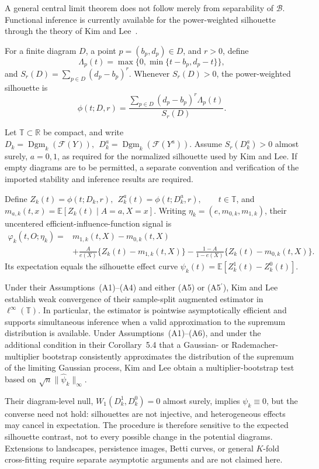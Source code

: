 \documentclass[11pt,a4paper]{article}
\theoremstyle{plain}
\theoremstyle{definition}
\theoremstyle{remark}
\newcommand{\1}{\mathbbm{1}}
\begin{document}
A general central limit theorem does not follow merely from
separability of \(\mathcal B\). Functional inference is currently available for the power-weighted silhouette through the theory of Kim and Lee~\citep{kimlee2026}.

For a finite diagram \(D\), a point \(p=(b_p,d_p)\in D\), and \(r>0\), define
\[
\Lambda_p(t)
=
\max\{0,\min\{t-b_p,d_p-t\}\},
\]
and \(S_r(D) = \sum_{p\in D}(d_p-b_p)^r\). Whenever \(S_r(D)>0\), the power-weighted silhouette is
\[
\phi(t;D,r)
=
\frac{
\sum_{p\in D}(d_p-b_p)^r\Lambda_p(t)
}{
S_r(D)
}.
\]

Let \(\mathbb T\subset\mathbb R\) be compact, and write
\(D_k = \operatorname{Dgm}_k(\mathcal F(Y)),
\ \ D_k^a = \operatorname{Dgm}_k(\mathcal F(Y^a))\). Assume
\(S_r(D_k^a)>0\) almost surely, \(a=0,1\), as required for the normalized silhouette used by Kim and Lee. If empty diagrams are to be permitted, a separate convention and verification of the imported stability and inference results are required.

Define \(Z_k(t)=\phi(t;D_k,r),\ \ Z_k^a(t)=\phi(t;D_k^a,r),
\qquad t\in\mathbb T\), and \(m_{a,k}(t,x) = \mathbb E[Z_k(t)\mid A=a,X=x]\). Writing \(\eta_k=(e,m_{0,k},m_{1,k})\), their uncentered efficient-influence-function signal is
\[
\begin{aligned}
\varphi_k(t,O;\eta_k)
={}&
m_{1,k}(t,X)-m_{0,k}(t,X) \\
&+
\frac{A}{e(X)}
\{Z_k(t)-m_{1,k}(t,X)\}
-
\frac{1-A}{1-e(X)}
\{Z_k(t)-m_{0,k}(t,X)\}.
\end{aligned}
\]
Its expectation equals the silhouette effect curve
\(\psi_k(t) = \mathbb E[Z_k^1(t)-Z_k^0(t)]\).

Under their Assumptions~(A1)--(A4) and either (A5) or (A5\(^{\prime}\)), Kim and Lee~\citep[Theorem~5.2]{kimlee2026} establish weak convergence of their sample-split augmented estimator in \(\ell^\infty(\mathbb T)\). In particular, the estimator is pointwise asymptotically efficient and supports simultaneous inference when a valid approximation to the supremum distribution is available. Under Assumptions~(A1)--(A6), and under the additional condition in their Corollary~5.4 that a Gaussian- or Rademacher-multiplier bootstrap consistently approximates the distribution of the supremum of the limiting Gaussian process, Kim and Lee obtain a multiplier-bootstrap test based on
\(\sqrt n\|\widehat\psi_k\|_\infty\).

Their diagram-level null,
\(W_1(D_k^1,D_k^0)=0\) almost surely, implies \(\psi_k\equiv0\), but the converse need not hold: silhouettes are not injective, and heterogeneous effects may cancel in expectation. The procedure is therefore sensitive to the expected silhouette contrast, not to every possible change in the potential diagrams. Extensions to landscapes, persistence images, Betti curves, or general \(K\)-fold cross-fitting require separate asymptotic arguments and are not claimed here.
\end{document}
